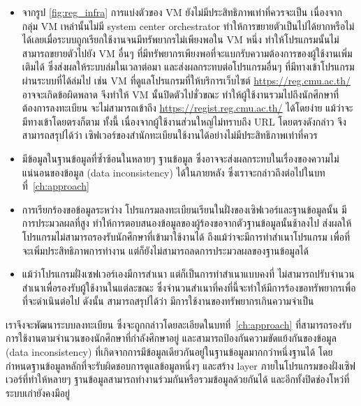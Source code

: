 \begin{itemize}
\item จากรูป \ref{fig:reg_infra} การแบ่งตัวของ VM \cite{vm} ยังไม่มีประสิทธิภาพเท่าที่ควรจะเป็น
เนื่องจากกลุ่ม VM เหล่านั้นไม่มี system center orchestrator \cite{sco} ทำให้การขยายตัวเป็นไปได้ยากหรือไม่ได้เลยเมื่อระบบถูกเรียกใช้งานจนมีทรัพยากรไม่เพียงพอใน VM หนึ่ง ทำให้โปรแกรมนั้นไม่สามารถขยายตัวไปยัง VM อื่นๆ ที่มีทรัพยากรเพียงพอที่จะแบกรับความต้องการของผู้ใช้งานเพิ่มเติมได้ ซึ่งส่งผลให้ระบบล่มในเวลาต่อมา และส่งผลกระทบต่อโปรแกรมอื่นๆ 
ที่มีทางเข้าโปรแกรมผ่านระบบที่ได้ล่มไป เช่น VM ที่ดูแลโปรแกรมที่ให้บริการเว็บไซต์ \url{https://reg.cmu.ac.th/} อาจจะเกิดข้อผิดพลาด จึงทำให้ VM นั้นปิดตัวไปชั่วขณะ ทำให้ผู้ใช้งานรวมไปถึงนักศึกษาที่ต้องการลงทะเบียน จะไม่สามารถเข้าถึง \url{https://regist.reg.cmu.ac.th/} ได้โดยง่าย แม้ว่าจะมีทางเข้าโดยตรงก็ตาม ทั้งนี้ เนื่องจากผู้ใช้งานส่วนใหญ่ไม่ทราบถึง URL โดยตรงดังกล่าว จึงสามารถสรุปได้ว่า เซิฟเวอร์ของสำนักทะเบียนใช้งานได้อย่างไม่มีประสิทธิภาพเท่าที่ควร

\item มีข้อมูลในฐานข้อมูลที่ซ้ำซ้อนในหลายๆ ฐานข้อมูล ซึ่งอาจจะส่งผลกระทบในเรื่องของความไม่แน่นอนของข้อมูล (data inconsistency) ได้ในภายหลัง ซึ่งเราจะกล่าวถึงต่อไปในบทที่~\ref{ch:approach}

\item การเรียกร้องขอข้อมูลระหว่าง โปรแกรมลงทะเบียนเรียนในฝั่งของเซิฟเวอร์และฐานข้อมูลนั้น มีการประมวลผลที่สูง ทำให้การตอบสนองข้อมูลของผู้ร้องขอจากตัวฐานข้อมูลนั้นช้าลงไป ส่งผลให้ โปรแกรมไม่สามารถรองรับนักศึกษาที่เข้ามาใช้งานได้ ถึงแม้ว่าจะมีการทำสำเนาโปรแกรม เพื่อที่จะเพิ่มประสิทธิภาพการทำงาน แต่ก็ยังไม่สามารถลดการประมวลผลของฐานข้อมูลได้

\item แม้ว่าโปรแกรมฝั่งเซฟเวอร์เองมีการสำเนา แต่ก็เป็นการทำสำเนาแบบคงที่ ไม่สามารถปรับจำนวนสำเนาเพื่อรองรับผู้ใช้งานในแต่ละขณะ ซึ่งจำนวนสำเนาที่คงที่นี้จะทำให้มีการร้องขอทรัพยากรเพื่อที่จะดำเนินต่อไป ดังนั้น สามารถสรุปได้ว่า มีการใช้งานของทรัพยากรเกินความจำเป็น
\end{itemize}

เราจึงจะพัฒนาระบบลงทะเบียน ซึ่งจะถูกกล่าวโดยละเอียดในบทที่~\ref{ch:approach} ที่สามารถรองรับการใช้งานตามจำนวนของนักศึกษาที่กำลังศึกษาอยู่ และสามารถป้องกันความขัดแย้งกันของข้อมูล (data inconsistency) ที่เกิดจากการมีข้อมูลเดียวกันอยู่ในฐานข้อมูลมากกว่าหนึ่งฐานได้ โดยกำหนดฐานข้อมูลหลักที่จะรับผิดชอบการดูแลข้อมูลหนึ่งๆ และสร้าง layer ภายในโปรแกรมของฝั่งเซิฟเวอร์ที่ทำให้หลายๆ ฐานข้อมูลสามารถทำงานร่วมกันหรือรวมข้อมูลด้วยกันได้ และอีกทั้งปิดช่องโหว่ที่ระบบเก่ายังคงมีอยู่

